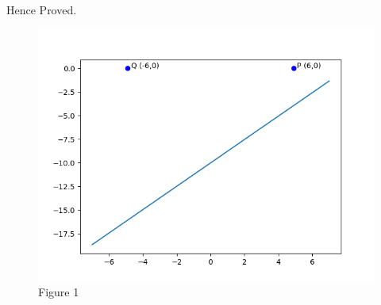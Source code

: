 \documentclass[journal,12pt,twocolumn]{IEEEtran}
\begin{document}
Hence Proved. 

\begin{figure}[h!]
  \centering
    \includegraphics[width=\linewidth]{figs/Figure_1.png}
    \caption{Figure 1}
    \label{fig}
\end{figure}
\end{document}
